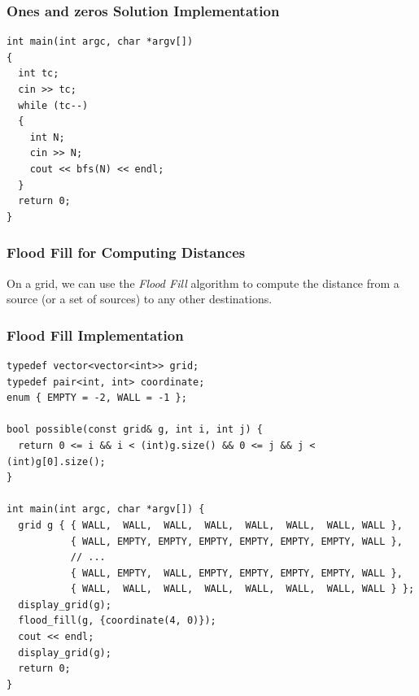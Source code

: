 \documentclass{beamer}
\begin{document}
\begin{frame}[containsverbatim]
\frametitle{Ones and zeros Solution Implementation}
\scriptsize
\begin{lstlisting}
int main(int argc, char *argv[])
{
  int tc;
  cin >> tc;
  while (tc--)
  {
    int N;
    cin >> N;
    cout << bfs(N) << endl;
  }
  return 0;
}
\end{lstlisting}

\end{frame}

\fi


\begin{frame}%
\frametitle{Flood Fill for Computing Distances}

On a grid, we can use the \emph{Flood Fill} algorithm to compute the distance from
a source (or a set of sources) to any other destinations.


\end{frame}

\begin{frame}[containsverbatim]
\frametitle{Flood Fill Implementation}
\scriptsize
\begin{lstlisting}
typedef vector<vector<int>> grid;
typedef pair<int, int> coordinate;
enum { EMPTY = -2, WALL = -1 };

bool possible(const grid& g, int i, int j) {
  return 0 <= i && i < (int)g.size() && 0 <= j && j < (int)g[0].size();
}

int main(int argc, char *argv[]) {
  grid g { { WALL,  WALL,  WALL,  WALL,  WALL,  WALL,  WALL, WALL },
           { WALL, EMPTY, EMPTY, EMPTY, EMPTY, EMPTY, EMPTY, WALL },
           // ...
           { WALL, EMPTY,  WALL, EMPTY, EMPTY, EMPTY, EMPTY, WALL },
           { WALL,  WALL,  WALL,  WALL,  WALL,  WALL,  WALL, WALL } };
  display_grid(g);
  flood_fill(g, {coordinate(4, 0)});
  cout << endl;
  display_grid(g);
  return 0;
}
\end{lstlisting}

\end{frame}
\end{document}
